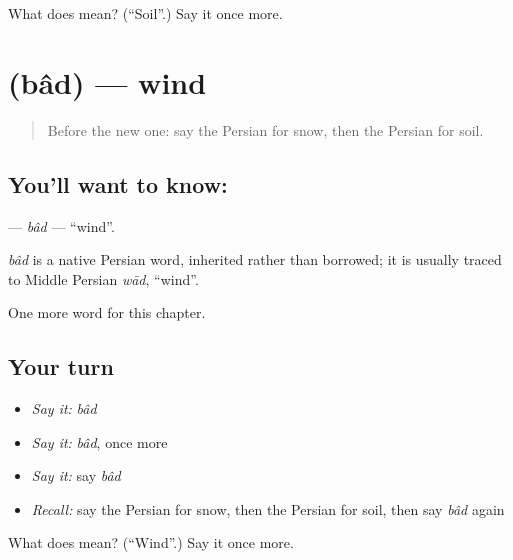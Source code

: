 \begin{tcolorbox}[breakable,colback=teal!4,colframe=teal!35!black,title={Before you move on}]
What does  mean? (\textquotedblleft{}Soil\textquotedblright{}.) Say it once more.
\end{tcolorbox}
\section[\texorpdfstring{\fa{باد} (bâd)}{باد (bâd)}]{ (bâd) — wind}

\label{lesson:FA-C54-bad}



\begin{quote}
Before the new one: say the Persian for snow, then the Persian for soil.
\end{quote}

\subsection*{You'll want to know: }
\textbf{} — \emph{bâd} — \textquotedblleft{}wind\textquotedblright{}.

\begin{cousinweb}
\emph{bâd} is a native Persian word, inherited rather than borrowed; it is usually traced to Middle Persian \emph{wād}, \textquotedblleft{}wind\textquotedblright{}.
\end{cousinweb}

\begin{grammarlens}[title={What you've built}]
One more word for this chapter.
\end{grammarlens}

\subsection*{Your turn}
\begin{itemize}
\raggedright
  \item \emph{Say it:} \emph{bâd}
  \item \emph{Say it:} \emph{bâd}, once more
  \item \emph{Say it:} say \emph{bâd}
  \item \emph{Recall:} say the Persian for snow, then the Persian for soil, then say \emph{bâd} again
\end{itemize}

\begin{tcolorbox}[breakable,colback=teal!4,colframe=teal!35!black,title={Before you move on}]
What does  mean? (\textquotedblleft{}Wind\textquotedblright{}.) Say it once more.
\end{tcolorbox}

